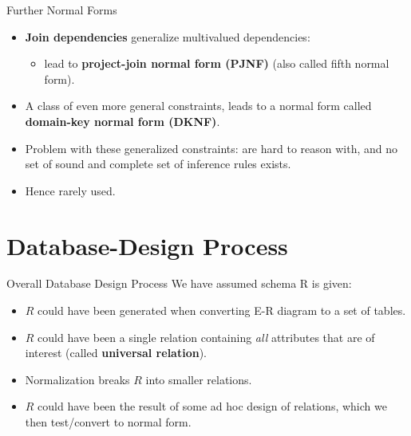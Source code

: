 \documentclass{beamer}
\begin{document}
\begin{frame}{Further Normal Forms}
    \begin{itemize}
        \item \textbf{Join dependencies} generalize multivalued dependencies:
            \begin{itemize}
                \item lead to \textbf{project-join normal form (PJNF)} (also called fifth normal form).
            \end{itemize}
        \item A class of even more general constraints, leads to a normal form called \textbf{domain-key normal form (DKNF)}.
        \item Problem with these generalized constraints: are hard to reason with, and no set of sound and complete set of inference rules exists.
        \item Hence rarely used.
    \end{itemize}
\end{frame}

\section{Database-Design Process}

\begin{frame}{Overall Database Design Process}
    We have assumed schema R is given:
        \begin{itemize}
            \item $R$ could have been generated when converting E-R diagram to a set of tables.
            \item $R$ could have been a single relation containing \textit{all} attributes that are of interest (called \textbf{universal relation}).
            \item Normalization breaks $R$ into smaller relations.
            \item $R$ could have been the result of some ad hoc design of relations, which we then test/convert to normal form.
        \end{itemize}
\end{frame}
\end{document}
